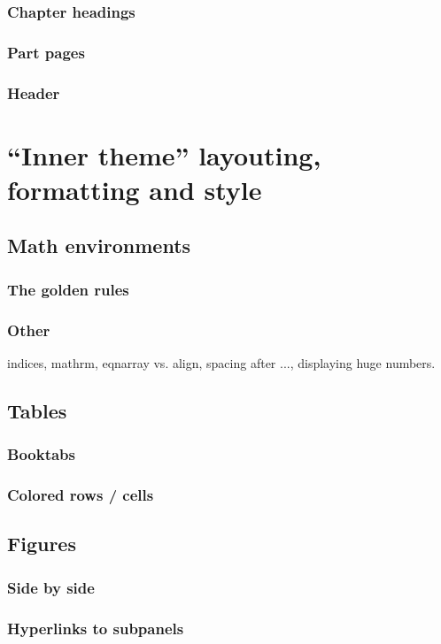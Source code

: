\subsection{Chapter headings}

\subsection{Part pages}

\subsection{Header}


\chapter{``Inner theme'' layouting, formatting and style}
\section{Math environments}
\subsection{The golden rules}
\subsection{Other}
indices, mathrm, eqnarray vs. align, spacing after ..., displaying huge numbers.
\section{Tables}
\subsection{Booktabs}
\subsection{Colored rows / cells}
\section{Figures}
\subsection{Side by side}
\subsection{Hyperlinks to subpanels}
